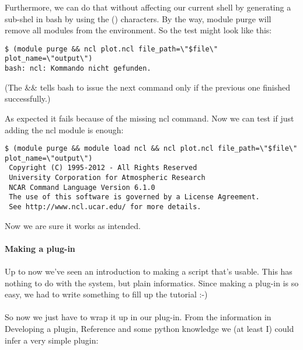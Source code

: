 \documentclass[a4paper,11pt]{ltxdoc}
\begin{document}
Furthermore, we can do that without affecting our current shell by generating a sub-shel in bash by using the () characters.
By the way, module purge will remove all modules from the environment. So the test might look like this:
\begin{lstlisting}
$ (module purge && ncl plot.ncl file_path=\"$file\" plot_name=\"output\")
bash: ncl: Kommando nicht gefunden.
\end{lstlisting}
(The \&\& tells bash to issue the next command only if the previous one finished successfully.)

As expected it fails because of the missing ncl command. Now we can test if just adding the ncl module is enough:
\begin{lstlisting}
$ (module purge && module load ncl && ncl plot.ncl file_path=\"$file\" plot_name=\"output\")
 Copyright (C) 1995-2012 - All Rights Reserved
 University Corporation for Atmospheric Research
 NCAR Command Language Version 6.1.0
 The use of this software is governed by a License Agreement.
 See http://www.ncl.ucar.edu/ for more details.
\end{lstlisting}
Now we are sure it works as intended.\\
\\
\textbf{Making a plug-in}\\
\\
Up to now we've seen an introduction to making a script that's usable. This has nothing to do with the system, but plain informatics.
Since making a plug-in is so easy, we had to write something to fill up the tutorial :-)\\
\\
So now we just have to wrap it up in our plug-in. From the information in Developing a plugin, Reference and some python knowledge we (at least I) could infer a very simple plugin:
\end{document}

